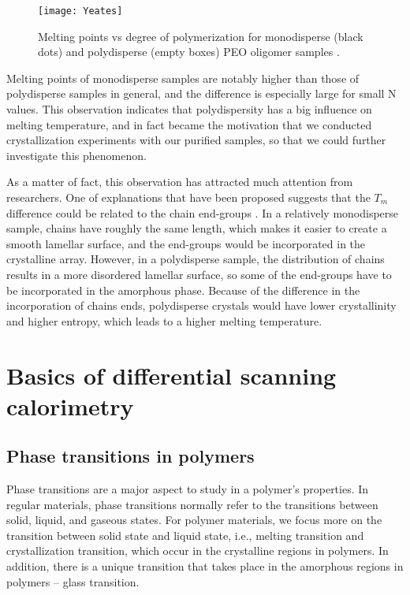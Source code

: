 \begin{figure}[H]
\center
\vspace{1 cm}
\texttt{[image: Yeates]}
\caption[Melting points vs degree of polymerization for monodisperse (black dots) and polydisperse (empty boxes) PEO oligomer samples.]{Melting points vs degree of polymerization for monodisperse (black dots) and polydisperse (empty boxes) PEO oligomer samples \cite{Yeates1984}.}
\label{fig:Yeates}
\end{figure}

Melting points of monodisperse samples are notably higher than those of polydisperse samples in general, and the difference is especially large for small N values. This observation indicates that polydispersity has a big influence on melting temperature, and in fact became the motivation that we conducted crystallization experiments with our purified samples, so that we could further investigate this phenomenon.

As a matter of fact, this observation has attracted much attention from researchers. One of explanations that have been proposed suggests that the $T_{m}$ difference could be related to the chain end-groups \cite{Percec1989}. In a relatively monodisperse sample, chains have roughly the same length, which makes it easier to create a smooth lamellar surface, and the end-groups would be incorporated in the crystalline array. However, in a polydisperse sample, the distribution of chains results in a more disordered lamellar surface, so some of the end-groups have to be incorporated in the amorphous phase. Because of the difference in the incorporation of chains ends, polydisperse crystals would have lower crystallinity and higher entropy, which leads to a higher melting temperature.

\section{Basics of differential scanning calorimetry}

\subsection{Phase transitions in polymers}

Phase transitions are a major aspect to study in a polymer's properties. In regular materials, phase transitions normally refer to the transitions between solid, liquid, and gaseous states. For polymer materials, we focus more on the transition between solid state and liquid state, i.e., melting transition and crystallization transition, which occur in the crystalline regions in polymers. In addition, there is a unique transition that takes place in the amorphous regions in polymers -- glass transition.

